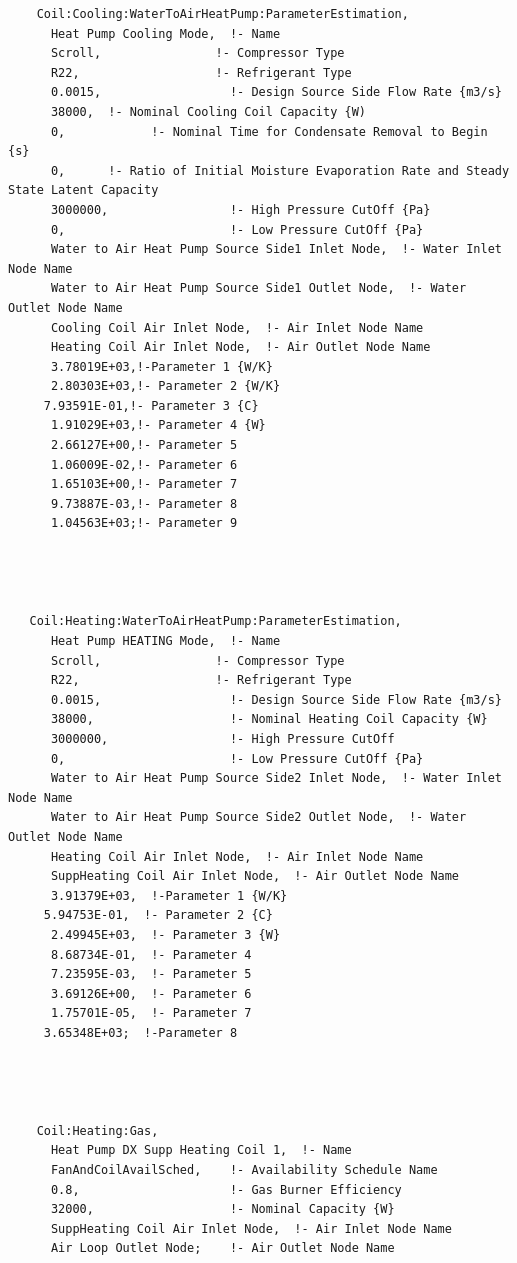 \begin{lstlisting}
    Coil:Cooling:WaterToAirHeatPump:ParameterEstimation,
      Heat Pump Cooling Mode,  !- Name
      Scroll,                !- Compressor Type
      R22,                   !- Refrigerant Type
      0.0015,                  !- Design Source Side Flow Rate {m3/s}
      38000,  !- Nominal Cooling Coil Capacity {W)
      0,            !- Nominal Time for Condensate Removal to Begin {s}
      0,      !- Ratio of Initial Moisture Evaporation Rate and Steady State Latent Capacity
      3000000,                 !- High Pressure CutOff {Pa}
      0,                       !- Low Pressure CutOff {Pa}
      Water to Air Heat Pump Source Side1 Inlet Node,  !- Water Inlet Node Name
      Water to Air Heat Pump Source Side1 Outlet Node,  !- Water Outlet Node Name
      Cooling Coil Air Inlet Node,  !- Air Inlet Node Name
      Heating Coil Air Inlet Node,  !- Air Outlet Node Name
      3.78019E+03,!-Parameter 1 {W/K}
      2.80303E+03,!- Parameter 2 {W/K}
     7.93591E-01,!- Parameter 3 {C}
      1.91029E+03,!- Parameter 4 {W}
      2.66127E+00,!- Parameter 5
      1.06009E-02,!- Parameter 6
      1.65103E+00,!- Parameter 7
      9.73887E-03,!- Parameter 8
      1.04563E+03;!- Parameter 9




   Coil:Heating:WaterToAirHeatPump:ParameterEstimation,
      Heat Pump HEATING Mode,  !- Name
      Scroll,                !- Compressor Type
      R22,                   !- Refrigerant Type
      0.0015,                  !- Design Source Side Flow Rate {m3/s}
      38000,                   !- Nominal Heating Coil Capacity {W}
      3000000,                 !- High Pressure CutOff
      0,                       !- Low Pressure CutOff {Pa}
      Water to Air Heat Pump Source Side2 Inlet Node,  !- Water Inlet Node Name
      Water to Air Heat Pump Source Side2 Outlet Node,  !- Water Outlet Node Name
      Heating Coil Air Inlet Node,  !- Air Inlet Node Name
      SuppHeating Coil Air Inlet Node,  !- Air Outlet Node Name
      3.91379E+03,  !-Parameter 1 {W/K}
     5.94753E-01,  !- Parameter 2 {C}
      2.49945E+03,  !- Parameter 3 {W}
      8.68734E-01,  !- Parameter 4
      7.23595E-03,  !- Parameter 5
      3.69126E+00,  !- Parameter 6
      1.75701E-05,  !- Parameter 7
     3.65348E+03;  !-Parameter 8




    Coil:Heating:Gas,
      Heat Pump DX Supp Heating Coil 1,  !- Name
      FanAndCoilAvailSched,    !- Availability Schedule Name
      0.8,                     !- Gas Burner Efficiency
      32000,                   !- Nominal Capacity {W}
      SuppHeating Coil Air Inlet Node,  !- Air Inlet Node Name
      Air Loop Outlet Node;    !- Air Outlet Node Name





\end{lstlisting}
